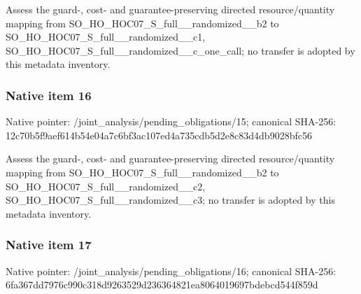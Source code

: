 \documentclass[10pt,a4paper]{article}
\begin{document}
\begingroup\raggedright\sloppy Assess the guard-,\allowbreak{} cost- and guarantee-preserving directed resource/\allowbreak{}quantity mapping from SO\_\allowbreak{}HO\_\allowbreak{}HOC07\_\allowbreak{}S\_\allowbreak{}full\_\allowbreak{}\_\allowbreak{}randomized\_\allowbreak{}\_\allowbreak{}b2 to SO\_\allowbreak{}HO\_\allowbreak{}HOC07\_\allowbreak{}S\_\allowbreak{}full\_\allowbreak{}\_\allowbreak{}randomized\_\allowbreak{}\_\allowbreak{}c1,\allowbreak{} SO\_\allowbreak{}HO\_\allowbreak{}HOC07\_\allowbreak{}S\_\allowbreak{}full\_\allowbreak{}\_\allowbreak{}randomized\_\allowbreak{}\_\allowbreak{}c\_\allowbreak{}one\_\allowbreak{}call;\allowbreak{} no transfer is adopted by this metadata inventory.\par\endgroup

\subsubsection{Native item 16}
Native pointer: /joint\_\allowbreak{}analysis/pending\_\allowbreak{}obligations/15; canonical SHA-256: 12c70b5f9aef614b54e04a7c6bf3ac107ed4a735cdb5d2e8c83d4db9028bfc56

\begingroup\raggedright\sloppy Assess the guard-,\allowbreak{} cost- and guarantee-preserving directed resource/\allowbreak{}quantity mapping from SO\_\allowbreak{}HO\_\allowbreak{}HOC07\_\allowbreak{}S\_\allowbreak{}full\_\allowbreak{}\_\allowbreak{}randomized\_\allowbreak{}\_\allowbreak{}b2 to SO\_\allowbreak{}HO\_\allowbreak{}HOC07\_\allowbreak{}S\_\allowbreak{}full\_\allowbreak{}\_\allowbreak{}randomized\_\allowbreak{}\_\allowbreak{}c2,\allowbreak{} SO\_\allowbreak{}HO\_\allowbreak{}HOC07\_\allowbreak{}S\_\allowbreak{}full\_\allowbreak{}\_\allowbreak{}randomized\_\allowbreak{}\_\allowbreak{}c3;\allowbreak{} no transfer is adopted by this metadata inventory.\par\endgroup

\subsubsection{Native item 17}
Native pointer: /joint\_\allowbreak{}analysis/pending\_\allowbreak{}obligations/16; canonical SHA-256: 6fa367dd7976c990c318d9263529d236364821ea8064019697bdebcd544f859d
\end{document}
